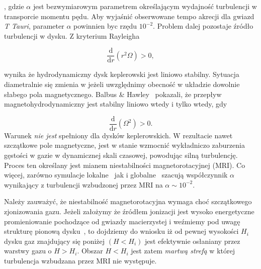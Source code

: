 , gdzie $\alpha$ jest bezwymiarowym parametrem określającym wydajność
turbulencji w transporcie momentu pędu. Aby wyjaśnić obserwowane tempo akrecji
dla gwiazd \emph{T Tauri}, parameter $\alpha$ powinnien byc rzędu $10^{-2}$.
Problem dalej pozostaje źródło turbulencji w dysku. Z kryterium
Rayleigha

\begin{equation}
   \frac{\mathrm{d}}{\mathrm{d}r}\left(r^2\Omega\right) > 0,
\end{equation}

wynika że hydrodynamiczny dysk keplerowski jest liniowo stabilny. Sytuacja
diametralnie się zmienia w jeżeli uwzględnimy obecność w układzie dowolnie
słabego pola magnetycznego. Balbus \& Hawley~\citep{BH91} pokazali, że przepływ
magnetohydrodynamiczny jest stabilny liniowo wtedy i tylko wtedy, gdy

\begin{equation}\label{eq:mri}
   \frac{\mathrm{d}}{\mathrm{d}r}\left(\Omega^2\right) > 0.
\end{equation}
Warunek  \emph{nie jest} spełniony dla dysków keplerowskich. W
rezultacie nawet szczątkowe pole magnetyczne, jest w stanie wzmocnić wykładniczo
zaburzenia gęstości w gazie w dynamicznej skali czasowej, powodując silną
turbulencję. Proces ten określany jest mianem niestabilności magnetorotacyjnej
(MRI). Co więcej, zarówno symulacje lokalne~\cite{Davis_Stone_Pessah_2010} jak
i globalne~\cite{Flock} szacują współczynnik $\alpha$ wynikający z turbulencji
wzbudzonej przez MRI na $\alpha\sim 10^{-2}$.
\par Należy zauważyć, że niestabilność magnetorotacyjna wymaga choć szczątkowego
zjonizowania gazu. Jeżeli założymy że źródłem jonizacji jest wysoko energetyczne
promieniowanie pochodzące od gwiazdy macierzystej i weźmiemy pod uwagę strukturę
pionową dysku~, to dojdziemy do wniosku iż od pewnej wysokości
$H_i$ dysku gaz znajdujący się poniżej $(H < H_i)$ jest efektywnie osłaniany
przez warstwy gazu o $H > H_i$. Obszar $H < H_i$ jest zatem \emph{martwą strefą}
w której turbulencja wzbudzana przez MRI nie występuje.

